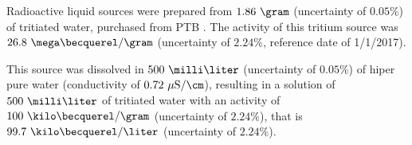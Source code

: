 Radioactive liquid sources were prepared from $1.86~\gram$ (uncertainty of $0.05\%$) of tritiated water, purchased from PTB \cite{PTB}. The activity of this tritium source was $26.8~\mega\becquerel/\gram$ (uncertainty of $2.24\%$, reference date of 1/1/2017).

This source was dissolved in $500~\milli\liter$ (uncertainty of $0.05\%$) of hiper pure water (conductivity of $0.72~\mu\text{S}/\cm$), resulting in a solution of $500~\milli\liter$ of tritiated water with an activity of $100~\kilo\becquerel/\gram$ (uncertainty of $2.24\%$), that is $99.7~\kilo\becquerel/\liter$ (uncertainty of $2.24\%$).


